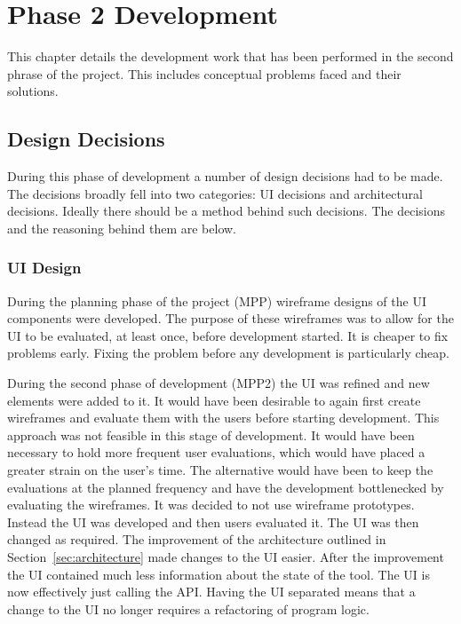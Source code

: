 \chapter{Phase 2 Development}
\label{chap:work}

This chapter details the development work that has been performed in the second phrase of the project.  This includes conceptual problems faced and their solutions.


\section{Design Decisions}
\label{sec:design}

During this phase of development a number of design decisions had to be made.  The decisions broadly fell into two categories:  \ac{UI} decisions and architectural decisions.  Ideally there should be a method behind such decisions.  The decisions and the reasoning behind them are below.

\subsection{\ac{UI} Design}

During the planning phase of the project (MPP) wireframe designs of the \ac{UI} components were developed.  The purpose of these wireframes was to allow for the \ac{UI} to be evaluated, at least once, before development started.  It is cheaper to fix problems early. Fixing the problem before any development is particularly cheap.


During the second phase of development (MPP2) the \ac{UI} was refined and new elements were added to it.  It would have been desirable to again first create wireframes and evaluate them with the users before starting development.  This approach was not feasible in this stage of development.  It would have been necessary to hold more frequent user evaluations, which would have placed a greater strain on the user's time.  The alternative would have been to keep the evaluations at the planned frequency and have the development bottlenecked by evaluating the wireframes.  It was decided to not use wireframe prototypes. Instead the \ac{UI} was developed and then users evaluated it.  The \ac{UI} was then changed as required.  The improvement of the architecture outlined in Section~\ref{sec:architecture} made changes to the \ac{UI} easier.  After the improvement the \ac{UI} contained much less information about the state of the tool.  The \ac{UI} is now effectively just calling the \ac{API}.  Having the \ac{UI} separated means that a change to the \ac{UI} no longer requires a refactoring of program logic.

